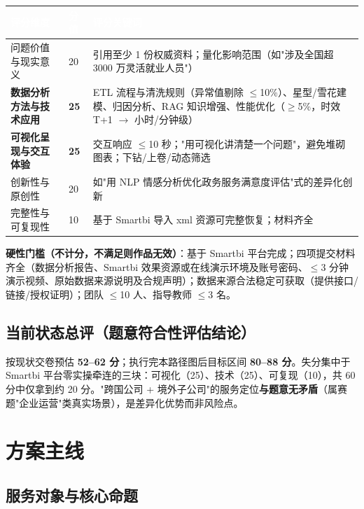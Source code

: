 \documentclass[UTF8,12pt]{ctexart}
\begin{document}
\begin{longtable}{p{4.6cm}p{1.4cm}p{8.6cm}}
\toprule
\rowcolor{navy}\textcolor{white}{\textbf{评分维度}} & \textcolor{white}{\textbf{分值}} & \textcolor{white}{\textbf{评分关键词}} \\
\midrule
问题价值与现实意义 & 20 & 引用至少 1 份权威资料；量化影响范围（如"涉及全国超 3000 万灵活就业人员"） \\
\rowcolor{amber}\textbf{数据分析方法与技术应用} & \textbf{25} & ETL 流程与清洗规则（异常值剔除 $\le$10\%）、星型/雪花建模、归因分析、RAG 知识增强、性能优化（$\ge$5\%，时效 T+1 $\to$ 小时/分钟级） \\
\rowcolor{amber}\textbf{可视化呈现与交互体验} & \textbf{25} & 交互响应 $\le$10 秒；"用可视化讲清楚一个问题"，避免堆砌图表；下钻/上卷/动态筛选 \\
创新性与原创性 & 20 & 如"用 NLP 情感分析优化政务服务满意度评估"式的差异化创新 \\
完整性与可复现性 & 10 & 基于 Smartbi 导入 xml 资源可完整恢复；材料齐全 \\
\bottomrule
\end{longtable}

\noindent\textbf{硬性门槛（不计分，不满足则作品无效）}：基于 Smartbi 平台完成；四项提交材料齐全（数据分析报告、Smartbi 效果资源或在线演示环境及账号密码、$\le$3 分钟演示视频、原始数据来源说明及合规声明）；数据来源合法稳定可获取（提供接口/链接/授权证明）；团队 $\le$10 人、指导教师 $\le$3 名。

\subsection{当前状态总评（题意符合性评估结论）}

按现状交卷预估 \textbf{52--62 分}；执行完本路径图后目标区间 \textbf{80--88 分}。失分集中于 Smartbi 平台零实操牵连的三块：可视化（25）、技术（25）、可复现（10），共 60 分中仅拿到约 20 分。"跨国公司 + 境外子公司"的服务定位\textbf{与题意无矛盾}（属赛题"企业运营"类真实场景），是差异化优势而非风险点。

\section{方案主线}

\subsection{服务对象与核心命题}
\end{document}
